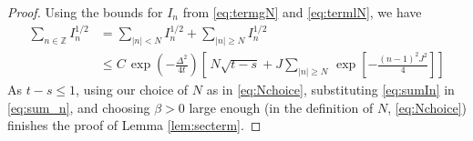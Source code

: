 \documentclass[10pt,a4paper]{amsart}
\newcommand{\Z}{\mathbb{Z}}
\begin{document}
\begin{proof}
Using the bounds for $I_n$ from \eqref{eq:termgN} and \eqref{eq:termlN},
we have
\begin{align} \label{eq:sumIn}
  \sum_{n\in \Z}  I_n^{1/2} 
& =   \sum_{\mid n \mid < N} I_n^{1/2}  
      +   \sum_{\mid n \mid \geq N}  I_n^{1/2}  \nonumber \\
  & \le  C\,\exp\left(-\frac{\Delta^2}{4t}\right)
    \left [ \,N\sqrt{t-s}  
       + J\sum_{\mid n \mid \geq N}\,
         \exp\left[-\frac{(n-1)^2J^2}{4}\right] \right]
\end{align}
As $t-s\le 1$, using our choice of $N$ as in \eqref{eq:Nchoice}, 
substituting \eqref{eq:sumIn} in \eqref{eq:sum_n}, and choosing $\beta >0$ 
large enough (in the definition of $N$, \eqref{eq:Nchoice}) finishes the proof of 
Lemma \ref{lem:secterm}.  
\end{proof}
\end{document}

